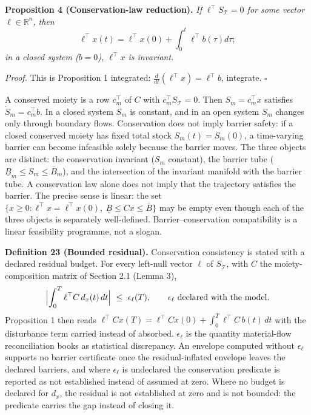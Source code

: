 \documentclass[11pt]{article}
\begin{document}
\textbf{Proposition 4 (Conservation-law reduction).} \emph{If
\(\ell^\top S_{\mathcal{T}} = 0\) for some vector
\(\ell \in \mathbb{R}^n\), then}
\[\ell^\top x(t) = \ell^\top x(0) + \int_0^t \ell^\top b(\tau) d\tau;\]
\emph{in a closed system (\(b = 0\)), \(\ell^\top x\) is invariant.}

\emph{Proof.} This is Proposition 1 integrated: \(\frac{d}{dt}(\ell^\top x) = \ell^\top b\), integrate. \ensuremath{\square}

A conserved moiety is a row \(c_m^\top\) of \(C\) with \(c_m^\top S_{\mathcal{T}} = 0\). Then \(S_m = c_m^\top x\) satisfies \(\dot S_m = c_m^\top b\). In a closed system \(S_m\) is constant, and in an open system \(S_m\) changes only through boundary flows. Conservation does not imply barrier safety: if a closed conserved moiety has fixed total stock \(S_m(t) = S_m(0)\), a time-varying barrier can become infeasible solely because the barrier moves. The three objects are distinct: the conservation invariant (\(S_m\) constant), the barrier tube (\(\underline{B}_m \le S_m \le \overline{B}_m\)), and the intersection of the invariant manifold with the barrier tube. A conservation law alone does not imply that the trajectory satisfies the barrier. The precise sense is linear: the set \(\{x \ge 0 : \ell^\top x = \ell^\top x(0),\ \underline{B} \le Cx \le \overline{B}\}\) may be empty even though each of the three objects is separately well-defined. Barrier--conservation compatibility is a linear feasibility programme, not a slogan.

\textbf{Definition 23 (Bounded residual).} Conservation consistency is stated with a declared residual budget. For every left-null vector \(\ell\) of \(S_{\mathcal{T}}\), with \(C\) the moiety-composition matrix of Section 2.1 (Lemma 3), \[ \Bigl|\int_0^T\ell^{\top}C\,d_x(t)\,dt\Bigr|\ \le\ \epsilon_\ell(T), \qquad \epsilon_\ell\ \text{declared with the model}. \] Proposition 1 then reads \(\ell^{\top}Cx(T)=\ell^{\top}Cx(0)+\int_0^T\ell^{\top}C\,b(t)\,dt\) with the disturbance term carried instead of absorbed. \(\epsilon_\ell\) is the quantity material-flow reconciliation books as statistical discrepancy. An envelope computed without \(\epsilon_\ell\) supports no barrier certificate once the residual-inflated envelope leaves the declared barriers, and where \(\epsilon_\ell\) is undeclared the conservation predicate is reported as not established instead of assumed at zero. Where no budget is declared for \(d_x\), the residual is not established at zero and is not bounded: the predicate carries the gap instead of closing it.
\end{document}
